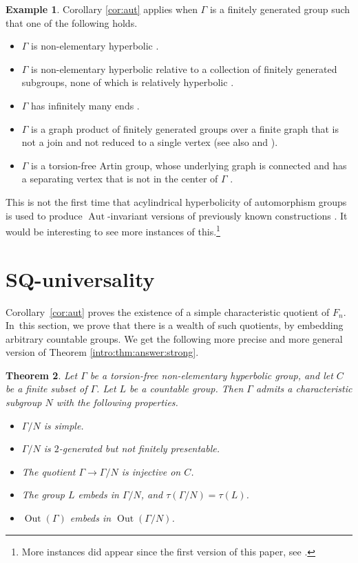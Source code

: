 \documentclass[11pt]{article}
\newtheorem{theorem}{Theorem}[section]
\theoremstyle{definition}
\newtheorem{example}[theorem]{Example}
\newcommand{\Aut}{\operatorname{Aut}}
\newcommand{\Out}{\operatorname{Out}}
\begin{document}
\begin{example}
\label{ex:list}
Corollary \ref{cor:aut} applies when $\Gamma$ is a finitely generated group such that one of the following holds.
\begin{itemize}
\item $\Gamma$ is non-elementary hyperbolic \cite{auto:oneend, auto:infend}.
\item $\Gamma$ is non-elementary hyperbolic relative to a collection of finitely generated subgroups, none of which is relatively hyperbolic \cite[Th.\,1.3]{auto:infend}.
\item $\Gamma$ has infinitely many ends \cite[Th.\,1.1]{auto:infend}.
\item $\Gamma$ is a graph product of finitely generated groups over a finite graph that is not a join and not reduced to a single vertex \cite[Th.\,A.27]{escalierhorbez} (see also \cite[Th.\,E]{auto:graph1} and \cite[Th.\,1.5]{auto:graph2}).
\item $\Gamma$ is a torsion-free Artin group, whose underlying graph is connected and has a separating vertex that is not in the center of $\Gamma$ \cite[Th.\,E]{auto:artin}.
\end{itemize}
This is not the first time that acylindrical hyperbolicity of automorphism groups is used to produce $\Aut$-invariant versions of previously known constructions \cite{osin:aut, ffw}. It would be interesting to see more instances of this.\footnote{More instances did appear since the first version of this paper, see \cite{fff:separable, rinfty}.}
\end{example}

\section{SQ-universality}

Corollary~\ref{cor:aut} proves the existence of a simple characteristic quotient of $F_n$. In~this section, we prove that there is a wealth of such quotients, by embedding arbitrary countable groups. We get the following more precise and more general version of Theorem \ref{intro:thm:answer:strong}.

\begin{theorem}
\label{thm:answer}
Let $\Gamma$ be a torsion-free non-elementary hyperbolic group, and let $C$ be a finite subset of $\Gamma$.
Let $L$ be a countable group.
Then $\Gamma$ admits a characteristic subgroup $N$ with the following properties.
\begin{itemize}
\item $\Gamma / N$ is simple.
\item $\Gamma / N$ is $2$-generated but not finitely presentable.
\item The quotient $\Gamma \to \Gamma / N$ is injective on $C$.
\item The group $L$ embeds in $\Gamma / N$, and $\tau(\Gamma / N) = \tau(L)$.
\item $\Out(\Gamma)$ embeds in $\Out(\Gamma / N)$.
\end{itemize}
\end{theorem}
\end{document}
